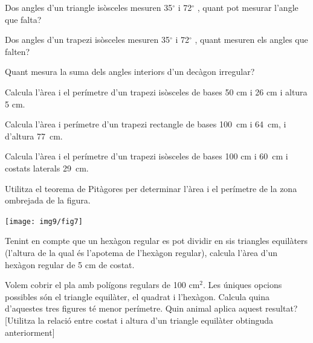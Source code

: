 \begin{mylist}
\exer  Dos angles d'un triangle isòsceles mesuren 35${}^\circ$  i 72${}^\circ$ , quant pot mesurar l'angle que falta?

\exer  Dos angles d'un trapezi isòsceles mesuren 35${}^\circ$  i 72${}^\circ$ , quant mesuren els angles que falten?


\exer  Quant mesura la suma dels angles interiors d'un decàgon irregular? 

\exer  Calcula l'àrea i el perímetre d'un trapezi isòsceles de bases 50 cm i 26 cm i altura 5 cm.

\exer  Calcula l'àrea i perímetre d'un trapezi rectangle de bases 100~cm i 64~cm, i d'altura 77~cm.
 
\exer  Calcula l'àrea i el perímetre d'un trapezi isòsceles de bases 100 cm i 60~cm i costats laterals 29~cm.

\vspace{-1.5cm}
\exer[1] \begin{minipage}[t]{0.66\textwidth}
	 Utilitza el teorema de Pitàgores per determinar l'àrea i el perímetre de la zona ombrejada de la figura.
\end{minipage}
\begin{minipage}{0.3\textwidth}
	\centering
	\vspace{1.5cm}
\texttt{[image: img9/fig7]}
\end{minipage}
 
\exer  Tenint en compte que un hexàgon regular es pot dividir en sis triangles equilàters (l'altura de la qual és l'apotema de l'hexàgon regular), calcula l'àrea d'un hexàgon regular de 5 cm de costat.

\exer  Volem cobrir el pla amb polígons regulars de 100 cm${}^{2}$. Les úniques opcions possibles són el triangle equilàter, el quadrat i l'hexàgon. Calcula quina d'aquestes tres figures té menor perímetre. Quin animal aplica aquest resultat? [Utilitza la relació entre costat i altura d'un triangle equilàter obtinguda anteriorment]


\end{mylist}
